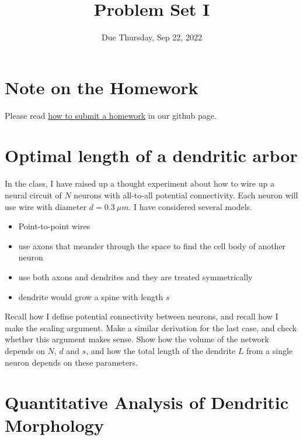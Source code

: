 \documentclass{article}
\title{Problem Set I}
\date{Due Thursday, Sep  22, 2022}
\begin{document}
\maketitle

\section*{Note on the Homework}

Please read \href{https://github.com/Wenlab/Computation-Neuro-Course/wiki/%E4%BD%9C%E4%B8%9A%E6%8F%90%E4%BA%A4}{how to submit a homework} in our github page.

\section*{Optimal length of a dendritic arbor}
In the class, I have raised up a thought experiment about how to wire up a neural circuit of $N$ neurons with all-to-all potential connectivity. Each neuron will use wire with diameter $d = 0.3\ \mu m$. I have considered several models.
\begin{itemize}
\item {Point-to-point wires} 
\item {use axons that meander through the space to find the cell body of another neuron}
\item {use both axons and dendrites and they are treated symmetrically}
\item {dendrite would grow a spine with length $s$}
\end{itemize} 
Recall how I define potential connectivity between neurons, and recall how I make the scaling argument. Make a similar derivation for the last case, and check whether this argument makes sense. Show how the volume of the network depends on $N$, $d$ and $s$,
and how the total length of the dendrite $L$ from a single neuron depends on these parameters. 


\section*{Quantitative Analysis of Dendritic Morphology}
\end{document}

